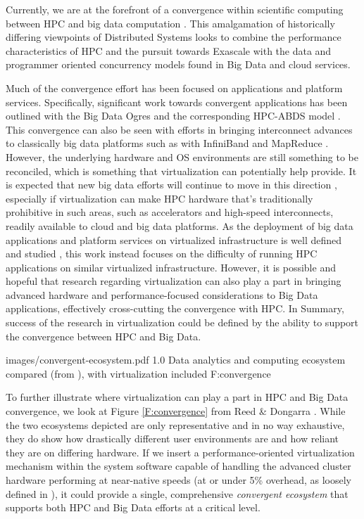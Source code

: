 Currently, we are at the forefront of a convergence within scientific computing between HPC and big data computation \cite{reed2015exascale}. This amalgamation of historically differing viewpoints of Distributed Systems looks to combine the performance characteristics of HPC and the pursuit towards Exascale with the data and programmer oriented concurrency models found in Big Data and cloud services. 

Much of the convergence effort has been focused on applications and platform services. Specifically, significant work towards convergent applications has been outlined with the Big Data Ogres \cite{Jha2014apache} and the corresponding HPC-ABDS model \cite{qiu2014towards}.  This convergence can also be seen with efforts in bringing interconnect advances to classically big data platforms such as with InfiniBand and MapReduce \cite{panda2013hadoop}. However, the underlying hardware and OS environments are still something to be reconciled, which is something that virtualization can potentially help provide. It is expected that new big data efforts will continue to move in this direction \cite{ekanayake2016spidal}, especially if virtualization can make HPC hardware that's traditionally prohibitive in such areas, such as accelerators and high-speed interconnects, readily available to cloud and big data platforms. As the deployment of big data applications and platform services on virtualized infrastructure is well defined and studied \cite{tian2011towards}, this work instead focuses on the difficulty of running HPC applications on similar virtualized infrastructure.  However, it is possible and hopeful that research regarding virtualization can also play a part in bringing advanced hardware and performance-focused considerations to Big Data applications, effectively cross-cutting the convergence with HPC. In Summary, success of the research in virtualization could be defined by the ability to support the convergence between HPC and Big Data.

 {images/convergent-ecosystem.pdf}
 {1.0}
 {Data analytics and computing ecosystem compared (from \cite{reed2015exascale}), with virtualization included}
 {F:convergence}


To further illustrate where virtualization can play a part in HPC and Big Data convergence, we look at Figure \ref{F:convergence} from Reed \& Dongarra \cite{reed2015exascale}. While the two ecosystems depicted are only representative and in no way exhaustive, they do show how drastically different user environments are and how reliant they are on differing hardware. If we insert a performance-oriented virtualization mechanism within the system software capable of handling the advanced cluster hardware performing at near-native speeds (at or under 5\% overhead, as loosely defined in \cite{lange2010palacios}), it could provide a single, comprehensive \emph{convergent ecosystem} that supports both HPC and Big Data efforts at a critical level. 


